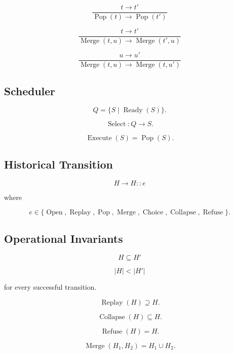 \documentclass[12pt,oneside]{article}
\theoremstyle{definition}
\theoremstyle{remark}
\begin{document}
\[
\frac
{t\longrightarrow t'}
{\operatorname{Pop}(t)
\longrightarrow
\operatorname{Pop}(t')}
\]

\[
\frac
{t\longrightarrow t'}
{\operatorname{Merge}(t,u)
\longrightarrow
\operatorname{Merge}(t',u)}
\]

\[
\frac
{u\longrightarrow u'}
{\operatorname{Merge}(t,u)
\longrightarrow
\operatorname{Merge}(t,u')}
\]

\subsection*{Scheduler}

\[
Q
=
\{
S
\mid
\operatorname{Ready}(S)
\}.
\]

\[
\operatorname{Select}
:
Q
\rightarrow
S.
\]

\[
\operatorname{Execute}
(S)
=
\operatorname{Pop}(S).
\]

\subsection*{Historical Transition}

\[
H
\longrightarrow
H::e
\]

where

\[
e
\in
\{
\operatorname{Open},
\operatorname{Replay},
\operatorname{Pop},
\operatorname{Merge},
\operatorname{Choice},
\operatorname{Collapse},
\operatorname{Refuse}
\}.
\]

\subsection*{Operational Invariants}

\[
H
\subseteq
H'
\]

\[
|H|
<
|H'|
\]

for every successful transition.

\[
\operatorname{Replay}
(H)
\supseteq
H.
\]

\[
\operatorname{Collapse}
(H)
\subseteq
H.
\]

\[
\operatorname{Refuse}
(H)
=
H.
\]

\[
\operatorname{Merge}
(H_1,H_2)
=
H_1\cup H_2.
\]
\end{document}
